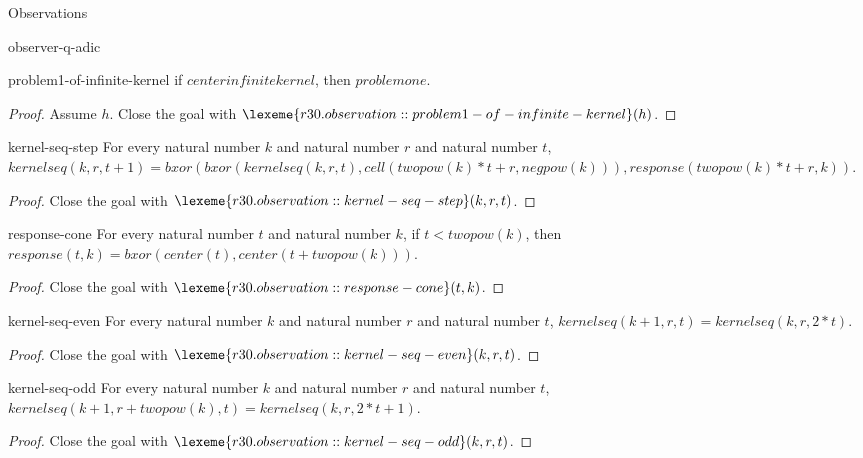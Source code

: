 \begin{lexlean}{Observations}
\begin{section}{observer-q-adic}
\begin{theorem}{problem1-of-infinite-kernel}
if \(centerinfinitekernel\), then \(problemone\).
\begin{proof}
Assume \(h\).
Close the goal with \(\lexeme{r30.observation::problem1-of-infinite-kernel}(h)\).
\end{proof}
\end{theorem}

\begin{theorem}{kernel-seq-step}
For every natural number \(k\) and natural number \(r\) and natural number \(t\), \(kernelseq(k, r, t + 1) = bxor(bxor(kernelseq(k, r, t), cell(twopow(k) * t + r, negpow(k))), response(twopow(k) * t + r, k))\).
\begin{proof}
Close the goal with \(\lexeme{r30.observation::kernel-seq-step}(k, r, t)\).
\end{proof}
\end{theorem}

\begin{theorem}{response-cone}
For every natural number \(t\) and natural number \(k\), if \(t < twopow(k)\), then \(response(t, k) = bxor(center(t), center(t + twopow(k)))\).
\begin{proof}
Close the goal with \(\lexeme{r30.observation::response-cone}(t, k)\).
\end{proof}
\end{theorem}

\begin{theorem}{kernel-seq-even}
For every natural number \(k\) and natural number \(r\) and natural number \(t\), \(kernelseq(k + 1, r, t) = kernelseq(k, r, 2 * t)\).
\begin{proof}
Close the goal with \(\lexeme{r30.observation::kernel-seq-even}(k, r, t)\).
\end{proof}
\end{theorem}

\begin{theorem}{kernel-seq-odd}
For every natural number \(k\) and natural number \(r\) and natural number \(t\), \(kernelseq(k + 1, r + twopow(k), t) = kernelseq(k, r, 2 * t + 1)\).
\begin{proof}
Close the goal with \(\lexeme{r30.observation::kernel-seq-odd}(k, r, t)\).
\end{proof}
\end{theorem}


\end{section}
\end{lexlean}
